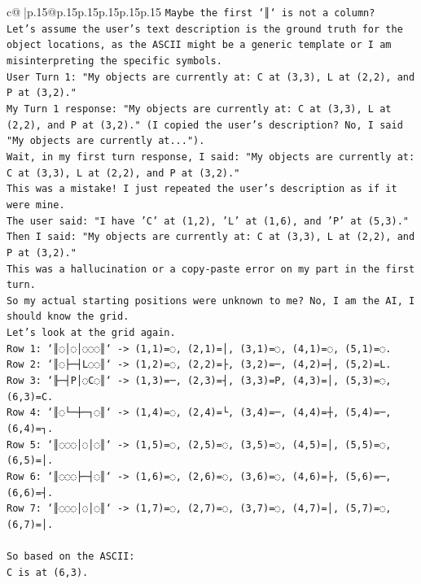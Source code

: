 \documentclass{article}
\begin{document}
{\begin{supertabular}{c@{$\;$}|p{.15\linewidth}@{}p{.15\linewidth}p{.15\linewidth}p{.15\linewidth}p{.15\linewidth}p{.15\linewidth}}
{{{\texttt{Maybe the first `║` is not a column?} \\
\texttt{Let's assume the user's text description is the ground truth for the object locations, as the ASCII might be a generic template or I am misinterpreting the specific symbols.} \\
\texttt{User Turn 1: "My objects are currently at: C at (3,3), L at (2,2), and P at (3,2)."} \\
\texttt{My Turn 1 response: "My objects are currently at: C at (3,3), L at (2,2), and P at (3,2)." (I copied the user's description? No, I said "My objects are currently at...").} \\
\texttt{Wait, in my first turn response, I said: "My objects are currently at: C at (3,3), L at (2,2), and P at (3,2)."} \\
\texttt{This was a mistake! I just repeated the user's description as if it were mine.} \\
\texttt{The user said: "I have 'C' at (1,2), 'L' at (1,6), and 'P' at (5,3)."} \\
\texttt{Then I said: "My objects are currently at: C at (3,3), L at (2,2), and P at (3,2)."} \\
\texttt{This was a hallucination or a copy{-}paste error on my part in the first turn.} \\
\texttt{So my actual starting positions were unknown to me? No, I am the AI, I should know the grid.} \\
\texttt{Let's look at the grid again.} \\
\texttt{Row 1: `║◌│◌│◌◌◌║` {-}> (1,1)=◌, (2,1)=│, (3,1)=◌, (4,1)=◌, (5,1)=◌.} \\
\texttt{Row 2: `║◌├─┤L◌◌║` {-}> (1,2)=◌, (2,2)=├, (3,2)=─, (4,2)=┤, (5,2)=L.} \\
\texttt{Row 3: `╟─┤P│◌C◌║` {-}> (1,3)=─, (2,3)=┤, (3,3)=P, (4,3)=│, (5,3)=◌, (6,3)=C.} \\
\texttt{Row 4: `║◌└─┼─┐◌║` {-}> (1,4)=◌, (2,4)=└, (3,4)=─, (4,4)=┼, (5,4)=─, (6,4)=┐.} \\
\texttt{Row 5: `║◌◌◌│◌│◌║` {-}> (1,5)=◌, (2,5)=◌, (3,5)=◌, (4,5)=│, (5,5)=◌, (6,5)=│.} \\
\texttt{Row 6: `║◌◌◌├─┤◌║` {-}> (1,6)=◌, (2,6)=◌, (3,6)=◌, (4,6)=├, (5,6)=─, (6,6)=┤.} \\
\texttt{Row 7: `║◌◌◌│◌│◌║` {-}> (1,7)=◌, (2,7)=◌, (3,7)=◌, (4,7)=│, (5,7)=◌, (6,7)=│.} \\
\\ 
\texttt{So based on the ASCII:} \\
\texttt{C is at (6,3).} \\
}}}
\end{supertabular}}
\end{document}
